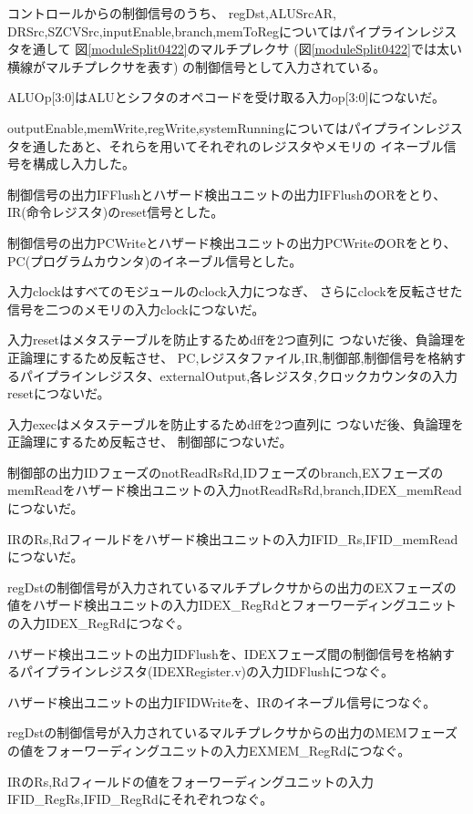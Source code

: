 \documentclass[a4j,titlepage]{jarticle}
\begin{document}
コントロールからの制御信号のうち、
regDst,ALUSrcAR,
DRSrc,SZCVSrc,inputEnable,branch,memToRegについてはパイプラインレジスタを通して
図\ref{moduleSplit0422}のマルチプレクサ
(図\ref{moduleSplit0422}では太い横線がマルチプレクサを表す)
の制御信号として入力されている。

ALUOp[3:0]はALUとシフタのオペコードを受け取る入力op[3:0]につないだ。

outputEnable,memWrite,regWrite,systemRunningについてはパイプラインレジスタを通したあと、それらを用いてそれぞれのレジスタやメモリの
イネーブル信号を構成し入力した。

制御信号の出力IFFlushとハザード検出ユニットの出力IFFlushのORをとり、IR(命令レジスタ)のreset信号とした。

制御信号の出力PCWriteとハザード検出ユニットの出力PCWriteのORをとり、PC(プログラムカウンタ)のイネーブル信号とした。


入力clockはすべてのモジュールのclock入力につなぎ、
さらにclockを反転させた信号を二つのメモリの入力clockにつないだ。

入力resetはメタステーブルを防止するためdffを2つ直列に
つないだ後、負論理を正論理にするため反転させ、
PC,レジスタファイル,IR,制御部,制御信号を格納するパイプラインレジスタ、externalOutput,各レジスタ,クロックカウンタの入力resetにつないだ。

入力execはメタステーブルを防止するためdffを2つ直列に
つないだ後、負論理を正論理にするため反転させ、
制御部につないだ。

制御部の出力IDフェーズのnotReadRsRd,IDフェーズのbranch,EXフェーズのmemReadをハザード検出ユニットの入力notReadRsRd,branch,IDEX\_memReadにつないだ。

IRのRs,Rdフィールドをハザード検出ユニットの入力IFID\_Rs,IFID\_memReadにつないだ。

regDstの制御信号が入力されているマルチプレクサからの出力のEXフェーズの値をハザード検出ユニットの入力IDEX\_RegRdとフォーワーディングユニットの入力IDEX\_RegRdにつなぐ。

ハザード検出ユニットの出力IDFlushを、IDEXフェーズ間の制御信号を格納するパイプラインレジスタ(IDEXRegister.v)の入力IDFlushにつなぐ。

ハザード検出ユニットの出力IFIDWriteを、IRのイネーブル信号につなぐ。

regDstの制御信号が入力されているマルチプレクサからの出力のMEMフェーズの値をフォーワーディングユニットの入力EXMEM\_RegRdにつなぐ。

IRのRs,Rdフィールドの値をフォーワーディングユニットの入力IFID\_RegRs,IFID\_RegRdにそれぞれつなぐ。
\end{document}
